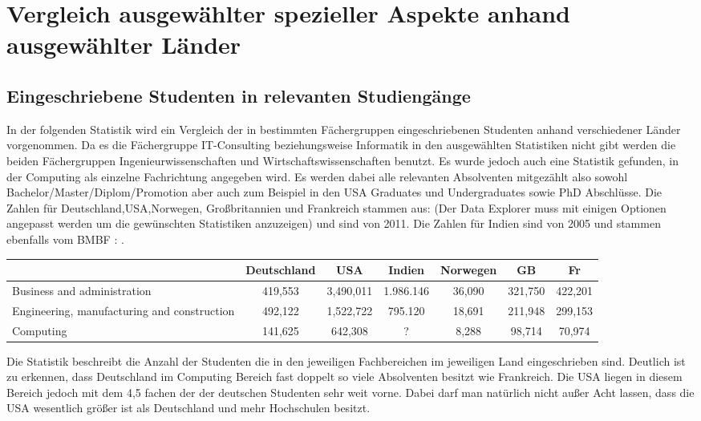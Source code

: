 \section{Vergleich ausgewählter spezieller Aspekte anhand ausgewählter Länder}

\subsection*{Eingeschriebene Studenten in relevanten Studiengänge}
In der folgenden Statistik wird ein Vergleich der in bestimmten Fächergruppen eingeschriebenen Studenten anhand verschiedener Länder vorgenommen. Da es die Fächergruppe IT-Consulting beziehungsweise Informatik in den ausgewählten Statistiken nicht gibt werden die beiden Fächergruppen Ingenieurwissenschaften und Wirtschaftswissenschaften benutzt. Es wurde jedoch auch eine Statistik gefunden, in der Computing als einzelne Fachrichtung angegeben wird. Es werden dabei alle relevanten Absolventen mitgezählt also sowohl Bachelor/Master/Diplom/Promotion aber auch zum Beispiel in den USA Graduates und Undergraduates sowie PhD Abschlüsse.
Die Zahlen für Deutschland,USA,Norwegen, Großbritannien und Frankreich stammen aus: \cite{studierende} (Der Data Explorer muss mit einigen Optionen angepasst werden um die gewünschten Statistiken anzuzeigen) und sind von 2011. Die Zahlen für Indien sind von 2005 und stammen ebenfalls vom BMBF : \cite{indienstudierende} .

\begin{table}[htp]
\begin{tabular}{|p{3cm}|c|c|c|c|c|c|}
\hline  	& Deutschland & USA & Indien  & Norwegen & GB & Fr \\ 
\hline  Business and administration & 419,553 & 3,490,011  & 1.986.146  & 36,090 & 321,750 & 422,201 \\ 
\hline  Engineering, manufacturing and construction & 492,122 & 1,522,722 & 795.120 & 18,691 & 211,948 & 299,153 \\ 
\hline  Computing &141,625  & 642,308 &? & 8,288 & 98,714 & 70,974\\ 
\hline 
\end{tabular} 
\end{table}
Die Statistik beschreibt die Anzahl der Studenten die in den jeweiligen Fachbereichen im jeweiligen Land eingeschrieben sind. Deutlich ist zu erkennen, dass Deutschland im Computing Bereich fast doppelt so viele Absolventen besitzt wie Frankreich. Die USA liegen in diesem Bereich jedoch mit dem 4,5 fachen der der deutschen Studenten sehr weit vorne. Dabei darf man natürlich nicht außer Acht lassen, dass die USA wesentlich größer ist als Deutschland und mehr Hochschulen besitzt.







